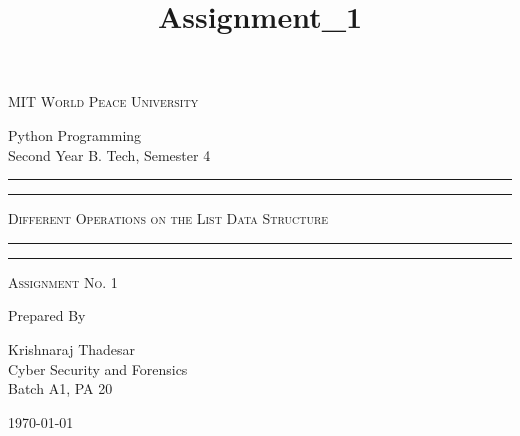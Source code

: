 \documentclass[11pt]{article}
\title{Assignment\_1}
\begin{document}
\begin{titlepage}
	\centering


	\huge\textsc{
		MIT World Peace University
	}\\

	\vspace{0.75\baselineskip} %

	\LARGE{
		Python Programming\\
		Second Year B. Tech, Semester 4
	}

	\vfill %


	\rule{\textwidth}{1.6pt}\vspace*{-\baselineskip}\vspace*{2pt}
	\rule{\textwidth}{0.6pt}
	\vspace{0.75\baselineskip} %



	\huge{\textsc{
			Different Operations on the List Data Structure
		}} \\



	\vspace{0.5\baselineskip} %
	\rule{\textwidth}{0.6pt}\vspace*{-\baselineskip}\vspace*{2.8pt}
	\rule{\textwidth}{1.6pt}

	\vspace{1\baselineskip} %


	\LARGE\textsc{
		Assignment No. 1
	} %
	\vfill


	Prepared By
	\vspace{0.5\baselineskip} %

	\Large{
		Krishnaraj Thadesar \\
		Cyber Security and Forensics\\
		Batch A1, PA 20
	}


	\vspace{0.5\baselineskip} %
	\today

\end{titlepage}
\end{document}
